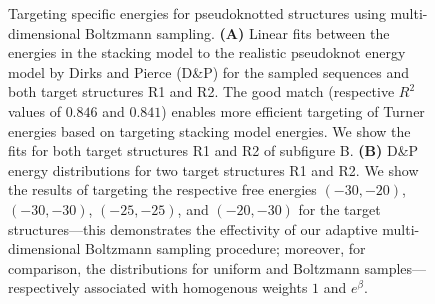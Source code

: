 \documentclass[]{bmcart}
\makeatletter
\newlength{\@aligneps}
\newcommand{\includegraphicstop}[2][]{%
\sbox{\@alignepsbox}{\texttt{[image: \#2]}}%
\setlength{\@aligneps}{-\ht\@alignepsbox}%
\addtolength{\@aligneps}{2ex}%
\raisebox{\@aligneps}{\usebox{\@alignepsbox}}}
\newcommand{\revised}[1]{{\color{red} #1}}
\makeatother
\begin{document}
\begin{figure}[t]
  \begin{center}
    \includegraphicstop[width=0.97\textwidth]{Figs/energy_shift}\hfill
  \end{center}
  \caption{%
    Targeting specific energies for pseudoknotted structures using
    multi-dimensional Boltzmann sampling. \textbf{(A)} Linear fits between the
    energies in the stacking model to the realistic pseudoknot energy
    model by Dirks and Pierce (D\&P) for the sampled sequences and both target structures R1 and R2. The good
    match \revised{(respective $R^2$ values of $0.846$ and $0.841$)} enables more efficient targeting of Turner energies based on
    targeting stacking model energies.  We show the fits for both
    target structures R1 and R2 of subfigure B.  \textbf{(B)} D\&P energy
    distributions for two target structures R1 and R2. We show the
    results of targeting the respective free energies $(-30,-20)$,
    $(-30,-30)$, $(-25,-25)$, and $(-20,-30)$ for the target
    structures---this demonstrates the effectivity of our adaptive
    multi-dimensional Boltzmann sampling procedure; moreover, for
    comparison, the distributions for uniform and Boltzmann
    samples---respectively associated with homogenous weights $1$ and
    $e^\beta$.
  }
  \label{fig:energydist-pk}
\end{figure}
\end{document}
